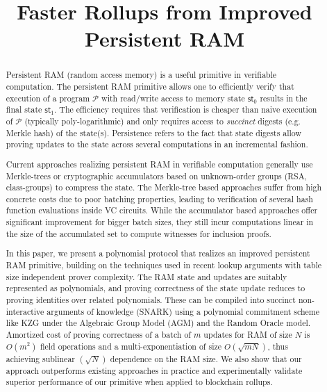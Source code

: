 \documentclass[11pt]{article}
\title{Faster Rollups from Improved Persistent RAM}
\begin{document}
    \maketitle
    \begin{abstract}
        Persistent RAM (random access memory) is a useful primitive in verifiable computation.
        The persistent RAM primitive allows one to efficiently verify that execution of a program $\mathcal{P}$
        with read/write access to memory state $\mathsf{st}_0$ results in the final state $\mathsf{st}_1$.
        The efficiency requires that verification is cheaper than naive execution of $\mathcal{P}$
        (typically poly-logarithmic) and only requires access to {\em succinct} digests (e.g. Merkle hash) of the state(s).
        Persistence refers to the fact that state digests allow proving updates to the state across several computations
        in an incremental fashion.

        Current approaches realizing persistent RAM in verifiable computation generally use Merkle-trees
        or cryptographic accumulators based on unknown-order groups (RSA, class-groups) to compress the state. The
        Merkle-tree based approaches suffer from high concrete costs due to poor batching properties, leading to
        verification of several hash function evaluations inside VC circuits. While the accumulator based approaches
        offer significant improvement for bigger batch sizes, they still incur computations linear in the size of the
        accumulated set to compute witnesses for inclusion proofs.

        In this paper, we present a polynomial protocol that realizes an improved persistent RAM primitive, building
        on the techniques used in recent lookup arguments with table size independent prover complexity.
        The RAM state and updates are suitably represented as polynomials, and proving correctness of the state update
        reduces to proving identities over related polynomials.
        These can be compiled into succinct non-interactive arguments
        of knowledge (SNARK) using a polynomial commitment scheme like \textsf{KZG} under the Algebraic Group Model (AGM) and
        the Random Oracle model. Amortized cost of proving correctness of a batch of $m$ updates for RAM of size $N$ is
        $O(m^2)$ field operations and a multi-exponentiation of size $O(\sqrt{mN})$, thus achieving sublinear $(\sqrt{N})$
        dependence on the RAM size. We also show that our approach outperforms existing approaches in practice and
        experimentally validate superior performance of our primitive when applied to blockchain rollups.

    \end{abstract}
\end{document}
